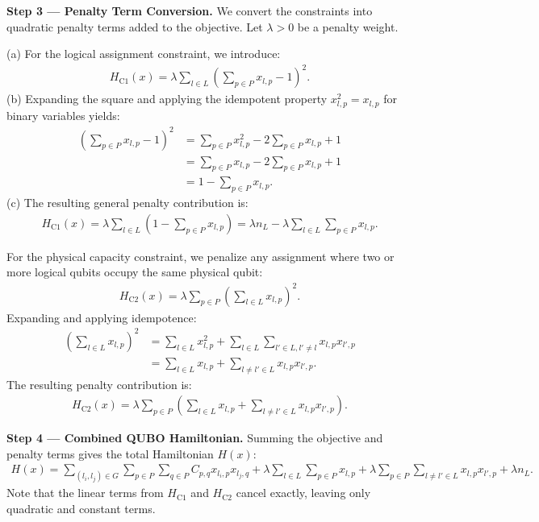 \documentclass[12pt]{article}
\begin{document}
\textbf{Step 3 --- Penalty Term Conversion.}
We convert the constraints into quadratic penalty terms added to the objective. Let $\lambda > 0$ be a penalty weight.

(a) For the logical assignment constraint, we introduce:
\begin{align}
H_{\text{C1}}(x) = \lambda \sum_{l \in L} \left( \sum_{p \in P} x_{l,p} - 1 \right)^2.
\end{align}
(b) Expanding the square and applying the idempotent property $x_{l,p}^2 = x_{l,p}$ for binary variables yields:
\begin{align}
\left( \sum_{p \in P} x_{l,p} - 1 \right)^2 &= \sum_{p \in P} x_{l,p}^2 - 2 \sum_{p \in P} x_{l,p} + 1 \nonumber \\
&= \sum_{p \in P} x_{l,p} - 2 \sum_{p \in P} x_{l,p} + 1 \nonumber \\
&= 1 - \sum_{p \in P} x_{l,p}.
\end{align}
(c) The resulting general penalty contribution is:
\begin{align}
H_{\text{C1}}(x) = \lambda \sum_{l \in L} \left( 1 - \sum_{p \in P} x_{l,p} \right) = \lambda n_L - \lambda \sum_{l \in L} \sum_{p \in P} x_{l,p}.
\end{align}

For the physical capacity constraint, we penalize any assignment where two or more logical qubits occupy the same physical qubit:
\begin{align}
H_{\text{C2}}(x) = \lambda \sum_{p \in P} \left( \sum_{l \in L} x_{l,p} \right)^2.
\end{align}
Expanding and applying idempotence:
\begin{align}
\left( \sum_{l \in L} x_{l,p} \right)^2 &= \sum_{l \in L} x_{l,p}^2 + \sum_{l \in L} \sum_{l' \in L, l' \neq l} x_{l,p} x_{l',p} \nonumber \\
&= \sum_{l \in L} x_{l,p} + \sum_{l \neq l' \in L} x_{l,p} x_{l',p}.
\end{align}
The resulting penalty contribution is:
\begin{align}
H_{\text{C2}}(x) = \lambda \sum_{p \in P} \left( \sum_{l \in L} x_{l,p} + \sum_{l \neq l' \in L} x_{l,p} x_{l',p} \right).
\end{align}

\textbf{Step 4 --- Combined QUBO Hamiltonian.}
Summing the objective and penalty terms gives the total Hamiltonian $H(x)$:
\begin{align}
H(x) = \sum_{(l_i, l_j) \in G} \sum_{p \in P} \sum_{q \in P} C_{p,q} x_{l_i,p} x_{l_j,q} + \lambda \sum_{l \in L} \sum_{p \in P} x_{l,p} + \lambda \sum_{p \in P} \sum_{l \neq l' \in L} x_{l,p} x_{l',p} + \lambda n_L.
\end{align}
Note that the linear terms from $H_{\text{C1}}$ and $H_{\text{C2}}$ cancel exactly, leaving only quadratic and constant terms.
\end{document}
